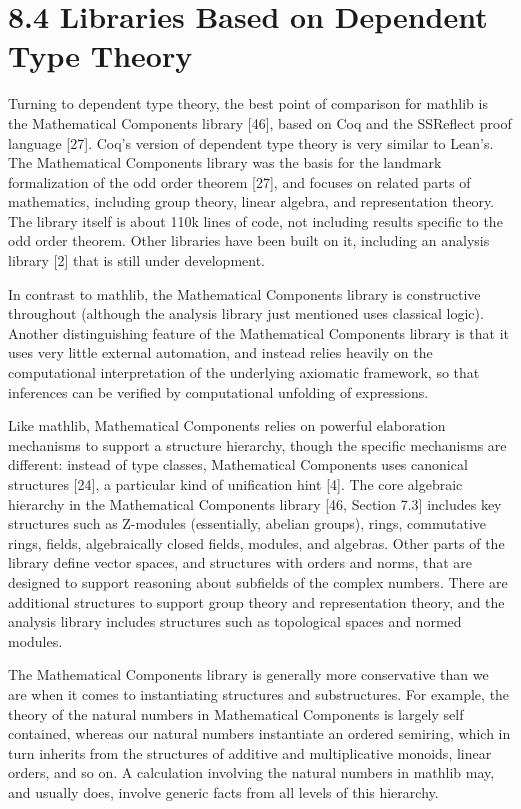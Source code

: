 \documentclass[
]{article}
\begin{document}
\section{8.4 Libraries Based on Dependent Type
Theory}\label{libraries-based-on-dependent-type-theory}

Turning to dependent type theory, the best point of comparison for
mathlib is the Mathematical Components library {[}46{]}, based on Coq
and the SSReflect proof language {[}27{]}. Coq's version of dependent
type theory is very similar to Lean's. The Mathematical Components
library was the basis for the landmark formalization of the odd order
theorem {[}27{]}, and focuses on related parts of mathematics, including
group theory, linear algebra, and representation theory. The library
itself is about 110k lines of code, not including results specific to
the odd order theorem. Other libraries have been built on it, including
an analysis library {[}2{]} that is still under development.

In contrast to mathlib, the Mathematical Components library is
constructive throughout (although the analysis library just mentioned
uses classical logic). Another distinguishing feature of the
Mathematical Components library is that it uses very little external
automation, and instead relies heavily on the computational
interpretation of the underlying axiomatic framework, so that inferences
can be verified by computational unfolding of expressions.

Like mathlib, Mathematical Components relies on powerful elaboration
mechanisms to support a structure hierarchy, though the specific
mechanisms are different: instead of type classes, Mathematical
Components uses canonical structures {[}24{]}, a particular kind of
unification hint {[}4{]}. The core algebraic hierarchy in the
Mathematical Components library {[}46, Section 7.3{]} includes key
structures such as Z-modules (essentially, abelian groups), rings,
commutative rings, fields, algebraically closed fields, modules, and
algebras. Other parts of the library define vector spaces, and
structures with orders and norms, that are designed to support reasoning
about subfields of the complex numbers. There are additional structures
to support group theory and representation theory, and the analysis
library includes structures such as topological spaces and normed
modules.

The Mathematical Components library is generally more conservative than
we are when it comes to instantiating structures and substructures. For
example, the theory of the natural numbers in Mathematical Components is
largely self contained, whereas our natural numbers instantiate an
ordered semiring, which in turn inherits from the structures of additive
and multiplicative monoids, linear orders, and so on. A calculation
involving the natural numbers in mathlib may, and usually does, involve
generic facts from all levels of this hierarchy.
\end{document}
